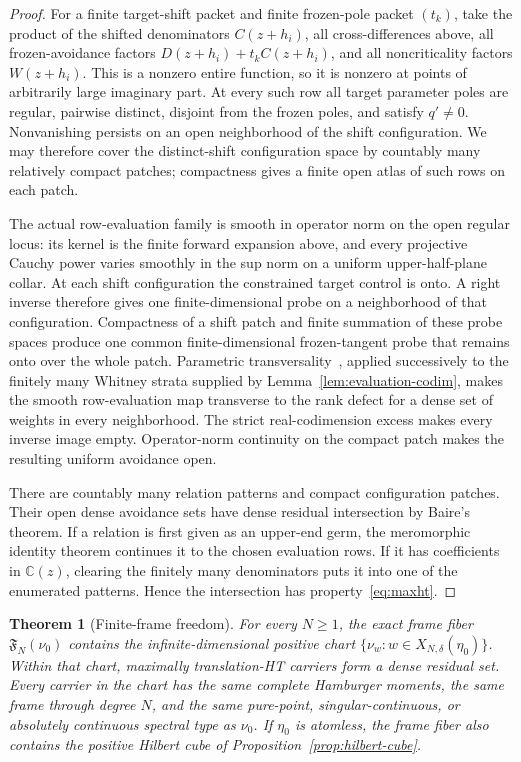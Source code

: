 \documentclass[11pt]{article}
\newtheorem{theorem}{Theorem}[section]
\newcommand{\C}{\mathbb C}
\begin{document}
\begin{proof}
For a finite target-shift packet and finite frozen-pole packet $(t_k)$, take the product of the
shifted denominators $C(z+h_i)$, all cross-differences above, all frozen-avoidance factors
$D(z+h_i)+t_kC(z+h_i)$, and all noncriticality factors $W(z+h_i)$.  This is a nonzero entire
function, so it is nonzero at points of arbitrarily large imaginary part.  At every such row all
target parameter poles are regular, pairwise distinct, disjoint from the frozen poles, and satisfy
$q'\ne0$.  Nonvanishing persists on an open neighborhood of the shift configuration.  We may
therefore cover the distinct-shift configuration space by countably many relatively compact
patches; compactness gives a finite open atlas of such rows on each patch.

The actual row-evaluation family is smooth in operator norm on the open regular locus: its kernel
is the finite forward expansion above, and every projective Cauchy power varies smoothly in the
sup norm on a uniform upper-half-plane collar.  At each shift configuration the constrained
target control is onto.  A right inverse therefore gives one finite-dimensional probe on a
neighborhood of that configuration.  Compactness of a shift patch and finite summation of these
probe spaces produce one common finite-dimensional frozen-tangent probe that remains onto over
the whole patch.  Parametric transversality~\cite[Chapter~3]{Hirsch1976}, applied successively to
the finitely many Whitney strata supplied by Lemma~\ref{lem:evaluation-codim}, makes the smooth
row-evaluation map transverse to the rank defect for a dense set of weights in every
neighborhood.  The strict real-codimension excess makes every inverse image empty.  Operator-norm
continuity on the compact patch makes the resulting uniform avoidance open.

There are countably many relation patterns and compact configuration patches.  Their open dense
avoidance sets have dense residual intersection by Baire's theorem.  If a relation is first given
as an upper-end germ, the meromorphic identity theorem continues it to the chosen evaluation
rows.  If it has coefficients in $\C(z)$, clearing the finitely many denominators puts it into one
of the enumerated patterns.  Hence the intersection has property~\eqref{eq:maxht}.
\end{proof}

\begin{theorem}[Finite-frame freedom]\label{thm:finite-frame}
For every $N\geq1$, the exact frame fiber $\mathfrak F_N(\nu_0)$ contains the
infinite-dimensional positive chart
$\{\nu_w:w\in X_{N,\delta}(\eta_0)\}$.  Within that chart, maximally translation-HT carriers form
a dense residual set.  Every carrier in the chart has the same complete Hamburger moments, the
same frame through degree $N$, and the same pure-point, singular-continuous, or absolutely
continuous spectral type as $\nu_0$.  If $\eta_0$ is atomless, the frame fiber also contains the
positive Hilbert cube of Proposition~\ref{prop:hilbert-cube}.
\end{theorem}
\end{document}

